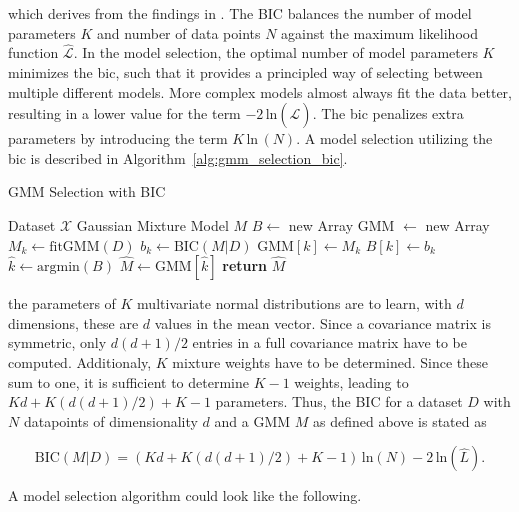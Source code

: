\documentclass[../../../main.tex]{subfiles}
\begin{document}
which derives from the findings in \cite{schwarz1978estimating}. The BIC balances the number of model parameters $K$ and number of data points $N$ against the maximum likelihood function $\hat{\mathcal{L}}$. In the model selection, the optimal number of model parameters $K$ minimizes the \gls{bic}, such that it provides a principled way of selecting between multiple different models. More complex models almost always fit the data better, resulting in a lower value for the term $-2 \, \text{ln}(\hat{\mathcal{L}})$. The \gls{bic} penalizes extra parameters by introducing the term $K \, \text{ln} \, (N)$. A model selection utilizing the \gls{bic} is described in Algorithm~\ref{alg:gmm_selection_bic}.

\begin{algorithm}
    \caption{GMM Selection with BIC}
    \label{alg:gmm_selection_bic}
    \begin{algorithmic}[1]
        \REQUIRE Dataset $\mathcal{X}$
        \ENSURE Gaussian Mixture Model $M$
        \STATE $B \leftarrow$ new Array
        \STATE GMM $\leftarrow$ new Array
            \STATE $M_k \leftarrow \text{fitGMM}(D)$
            \STATE $b_k \leftarrow \text{BIC}(M|D)$
            \STATE GMM$[k] \leftarrow M_k$
            \STATE $B[k] \leftarrow b_k$
        \ENDFOR
        \STATE $\hat{k} \leftarrow \text{argmin}(B)$
        \STATE $\hat{M} \leftarrow \text{GMM}[\hat{k}]$
        \STATE \textbf{return} $\hat{M}$

        
    \end{algorithmic}
 \end{algorithm}


the parameters of $K$ multivariate normal distributions are to learn, with $d$ dimensions, these are $d$ values in the mean vector.  Since a covariance matrix is symmetric, only $d(d+1)/2$ entries in a full covariance matrix have to be computed. Additionaly, $K$ mixture weights have to be determined. Since these sum to one, it is sufficient to determine $K-1$ weights, leading to $Kd + K(d(d+1)/2)+K-1$ parameters. Thus, the BIC for a dataset $D$ with $N$ datapoints of dimensionality $d$ and a GMM $M$ as defined above is stated as 

\begin{equation}\label{eq:bic}
    \text{BIC}(M|D) = (Kd + K(d(d+1)/2)+K-1) \, \text{ln}(N) - 2 \, \text{ln}(\hat{L}).
\end{equation}

A model selection algorithm could look like the following.
\end{document}
